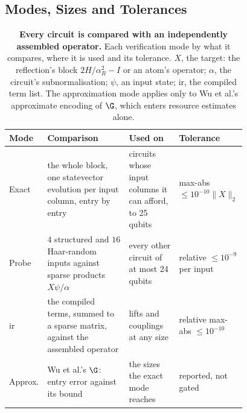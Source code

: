 %

\subsection{Modes, Sizes and Tolerances}
\label{app:verification-modes}

\begin{table}[htbp]
    \centering
    \caption[Operator verification modes and their tolerances]{\textbf{Every circuit is compared with an independently assembled operator.} Each verification mode by what it compares, where it is used and its tolerance. $X$, the target: the reflection's block $2H/\alpha_R^2-I$ or an atom's operator; $\alpha$, the circuit's subnormalisation; $\psi$, an input state; \gls{ir}, the compiled term list. The approximation mode applies only to Wu et al.'s approximate encoding of $\G$, which enters resource estimates alone.}
    \label{tab:verification-modes}
    \small
    \begin{tabular}{@{}l p{0.37\linewidth} p{0.22\linewidth} p{0.19\linewidth}@{}}
        \toprule
        Mode & Comparison & Used on & Tolerance \\
        \midrule
        Exact & the whole block, one statevector evolution per input column, entry by entry & circuits whose input columns it can afford, to 25 qubits & max-abs $\le10^{-10}\|X\|_2$ \\
        Probe & $4$ structured and $16$ Haar-random inputs against sparse products $X\psi/\alpha$ & every other circuit of at most 24 qubits & relative $\le10^{-9}$ per input \\
        \gls{ir} & the compiled terms, summed to a sparse matrix, against the assembled operator & lifts and couplings at any size & relative max-abs $\le10^{-10}$ \\
        Approx. & Wu et al.'s $\G$: entry error against its bound & the sizes the exact mode reaches & reported, not gated \\
        \bottomrule
    \end{tabular}
\end{table}

